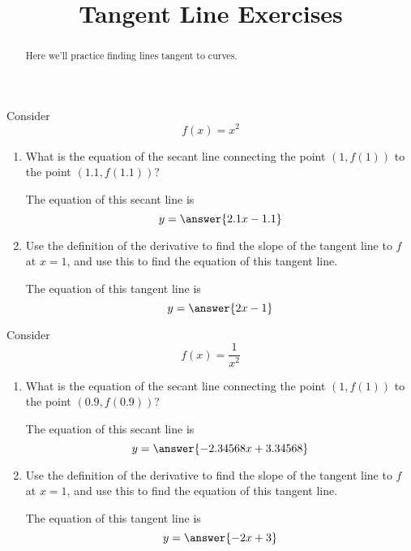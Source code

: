 \documentclass[handout]{ximera}
\title[Exercises:]{Tangent Line Exercises}
\begin{document}
\begin{abstract}
  Here we'll practice finding lines tangent to curves.
\end{abstract}
\maketitle

\begin{exercise}
Consider 
\[
f(x) = x^2
\]

\begin{enumerate}
\item What is the equation of the secant line connecting the point $(1,f(1))$ to the point $(1.1,f(1.1))$? 

The equation of this secant line is
$$ y = \answer{ 2.1x - 1.1}$$ 

\item  Use the definition of the derivative to find the slope of the tangent line to $f$ at $x=1$, and use this to find the equation of this tangent line.

The equation of this tangent line is
$$ y = \answer{2x - 1}$$ 

\end{enumerate}
\end{exercise}

\begin{exercise}
Consider 
\[
f(x) = \frac{1}{x^2}
\]

\begin{enumerate}
\item What is the equation of the secant line connecting the point $(1,f(1))$ to the point $(0.9,f(0.9))$? 

The equation of this secant line is
$$ y = \answer{ -2.34568x+ 3.34568}$$ 


\item  Use the definition of the derivative to find the slope of the tangent line to $f$ at $x=1$, and use this to find the equation of this tangent line.

The equation of this tangent line is
$$ y = \answer{ -2x + 3}$$ 

\end{enumerate}

\end{exercise}
\end{document}
